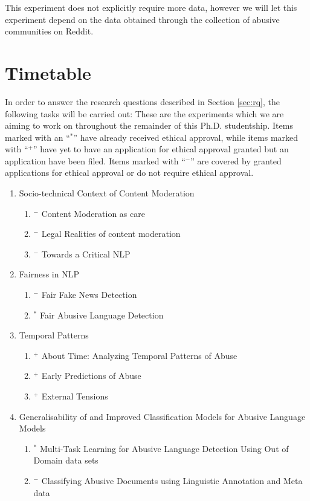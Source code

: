 This experiment does not explicitly require more data, however we will let this experiment depend on the data obtained through the collection of abusive communities on Reddit.


\section{Timetable}\label{sec:timetable}
In order to answer the research questions described in Section \autoref{sec:rq}, the following tasks will be carried out:
These are the experiments which we are aiming to work on throughout the remainder of this Ph.D. studentship. Items marked with an ``$^*$'' have already received ethical approval, while items marked with ``$^+$'' have yet to have an application for ethical approval granted but an application have been filed. Items marked with ``$^-$'' are covered by granted applications for ethical approval or do not require ethical approval.
\newpage

\begin{enumerate}
  \item{Socio-technical Context of Content Moderation}
    \begin{enumerate}
      \item{$^-$ Content Moderation as care}
      \item{$^-$ Legal Realities of content moderation}
      \item{$^-$ Towards a Critical NLP}
    \end{enumerate}
  \item{Fairness in NLP}
    \begin{enumerate}
      \item{$^-$ Fair Fake News Detection}
      \item{$^*$ Fair Abusive Language Detection}
    \end{enumerate}
  \item{Temporal Patterns}
    \begin{enumerate}
      \item{$^+$ About Time: Analyzing Temporal Patterns of Abuse}
      \item{$^+$ Early Predictions of Abuse}
      \item{$^+$ External Tensions}
    \end{enumerate}
  \item{Generalisability of and Improved Classification Models for Abusive Language Models}
    \begin{enumerate}
      \item{$^*$ Multi-Task Learning for Abusive Language Detection Using Out of Domain data sets}
      \item{$^-$ Classifying Abusive Documents using Linguistic Annotation and Meta data}
    \end{enumerate}
\end{enumerate}

